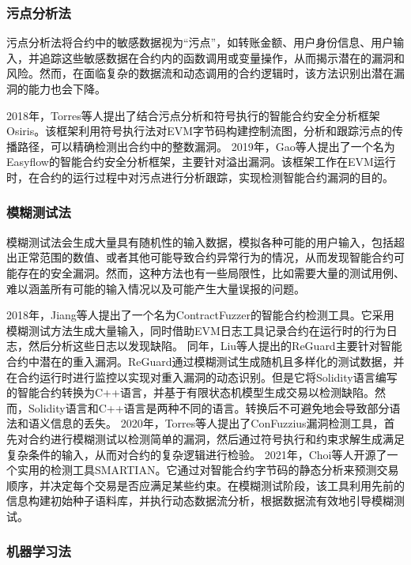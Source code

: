     \subsubsection{污点分析法}
    
    污点分析法将合约中的敏感数据视为“污点”，如转账金额、用户身份信息、用户输入，并追踪这些敏感数据在合约内的函数调用或变量操作，从而揭示潜在的漏洞和风险\cite{tongjunchen}。然而，在面临复杂的数据流和动态调用的合约逻辑时，该方法识别出潜在漏洞的能力也会下降。
    
    2018年，Torres等人提出了结合污点分析和符号执行的智能合约安全分析框架Osiris\cite{torres2018osiris}。该框架利用符号执行法对EVM字节码构建控制流图，分析和跟踪污点的传播路径，可以精确检测出合约中的整数漏洞。
    2019年，Gao等人提出了一个名为Easyflow\cite{gao2019easyflow}的智能合约安全分析框架，主要针对溢出漏洞。该框架工作在EVM运行时，在合约的运行过程中对污点进行分析跟踪，实现检测智能合约漏洞的目的。
    \subsubsection{模糊测试法}
    
    模糊测试法会生成大量具有随机性的输入数据，模拟各种可能的用户输入，包括超出正常范围的数值、或者其他可能导致合约异常行为的情况，从而发现智能合约可能存在的安全漏洞。然而，这种方法也有一些局限性，比如需要大量的测试用例、难以涵盖所有可能的输入情况以及可能产生大量误报的问题。
    
    2018年，Jiang等人提出了一个名为ContractFuzzer\cite{jiang2018contractfuzzer}的智能合约检测工具。它采用模糊测试方法生成大量输入，同时借助EVM日志工具记录合约在运行时的行为日志，然后分析这些日志以发现缺陷。
    同年，Liu等人提出的ReGuard\cite{reguard}主要针对智能合约中潜在的重入漏洞。ReGuard通过模糊测试生成随机且多样化的测试数据，并在合约运行时进行监控以实现对重入漏洞的动态识别。但是它将Solidity语言编写的智能合约转换为C++语言，并基于有限状态机模型生成交易以检测缺陷。然而，Solidity语言和C++语言是两种不同的语言。转换后不可避免地会导致部分语法和语义信息的丢失。
    2020年，Torres等人提出了ConFuzzius\cite{confuzzius}漏洞检测工具，首先对合约进行模糊测试以检测简单的漏洞，然后通过符号执行和约束求解生成满足复杂条件的输入，从而对合约的复杂逻辑进行检验。
    2021年，Choi等人开源了一个实用的检测工具SMARTIAN\cite{smartian}。它通过对智能合约字节码的静态分析来预测交易顺序，并决定每个交易是否应满足某些约束。在模糊测试阶段，该工具利用先前的信息构建初始种子语料库，并执行动态数据流分析，根据数据流有效地引导模糊测试。

    
    \subsubsection{机器学习法}
    
